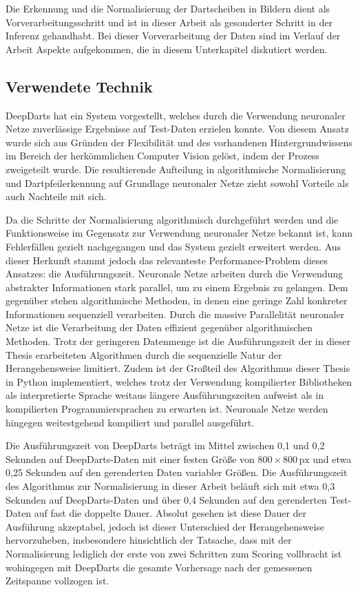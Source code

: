 Die Erkennung und die Normalisierung der Dartscheiben in Bildern dient als Vorverarbeitungsschritt und ist in dieser Arbeit als gesonderter Schritt in der Inferenz gehandhabt. Bei dieser Vorverarbeitung der Daten sind im Verlauf der Arbeit Aspekte aufgekommen, die in diesem Unterkapitel diskutiert werden.

\subsection{Verwendete Technik}

DeepDarts hat ein System vorgestellt, welches durch die Verwendung neuronaler Netze zuverlässige Ergebnisse auf Test-Daten erzielen konnte. Von diesem Ansatz wurde sich aus Gründen der Flexibilität und des vorhandenen Hintergrundwissens im Bereich der herkömmlichen Computer Vision gelöst, indem der Prozess zweigeteilt wurde. Die resultierende Aufteilung in algorithmische Normalisierung und Dartpfeilerkennung auf Grundlage neuronaler Netze zieht sowohl Vorteile als auch Nachteile mit sich.

Da die Schritte der Normalisierung algorithmisch durchgeführt werden und die Funktionsweise im Gegensatz zur Verwendung neuronaler Netze bekannt ist, kann Fehlerfällen gezielt nachgegangen und das System gezielt erweitert werden. Aus dieser Herkunft stammt jedoch das relevanteste Performance-Problem dieses Ansatzes: die Ausführungszeit. Neuronale Netze arbeiten durch die Verwendung abstrakter Informationen stark parallel, um zu einem Ergebnis zu gelangen. Dem gegenüber  stehen algorithmische Methoden, in denen eine geringe Zahl konkreter Informationen sequenziell verarbeiten. Durch die massive Parallelität neuronaler Netze ist die Verarbeitung der Daten effizient gegenüber algorithmischen Methoden. Trotz der geringeren Datenmenge ist die Ausführungszeit der in dieser Thesis erarbeiteten Algorithmen durch die sequenzielle Natur der Herangehensweise limitiert. Zudem ist der Großteil des Algorithmus dieser Thesis in Python implementiert, welches trotz der Verwendung kompilierter Bibliotheken als interpretierte Sprache weitaus längere Ausführungszeiten aufweist als in kompilierten Programmiersprachen zu erwarten ist. Neuronale Netze werden hingegen weitestgehend kompiliert und parallel ausgeführt.

Die Ausführungszeit von DeepDarts beträgt im Mittel zwischen 0,1 und 0,2 Sekunden auf DeepDarts-Daten mit einer festen Größe von $800 \times 800\,\text{px}$ und etwa 0,25 Sekunden auf den gerenderten Daten variabler Größen. Die Ausführungszeit des Algorithmus zur Normalisierung in dieser Arbeit beläuft sich mit etwa 0,3 Sekunden auf DeepDarts-Daten und über 0,4 Sekunden auf den gerenderten Test-Daten auf fast die doppelte Dauer. Absolut gesehen ist diese Dauer der Ausführung akzeptabel, jedoch ist dieser Unterschied der Herangehensweise hervorzuheben, insbesondere hinsichtlich der Tatsache, dass mit der Normalisierung lediglich der erste von zwei Schritten zum Scoring vollbracht ist wohingegen mit DeepDarts die gesamte Vorhersage nach der gemessenen Zeitspanne vollzogen ist.

